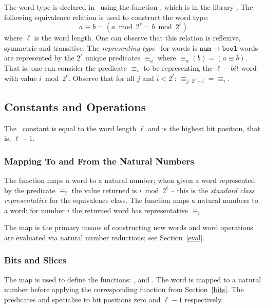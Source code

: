 The word type is declared in \HOL\ using the function , which is in the library .  The following equivalence relation is used to construct the word type:
\[ a \equiv b = (a \bmod 2^\ell = b \bmod 2^\ell) \]
where $\ell$ is the word length.
One can observe that this relation is reflexive, symmetric and transitive.
The \emph{representing type}~\cite{gordon-melham-hol} for words is $\mathtt{num}\rightarrow\mathtt{bool}$ \ie{} words are represented by the $2^\ell$ unique predicates ${\equiv_a}$ where ${\equiv_a}(b) = (a \equiv b)$.  That is, one can consider the predicate ${\equiv_i}$ to be representing the $\ell-bit$ word with value $i \bmod 2^\ell$.  Observe that for all $j$ and $i < 2^\ell$: ${\equiv_{j\cdot 2^\ell + i}} = {\equiv_i}$.

\subsection{Constants and Operations} \label{ops}

The \HOL\ constant  is equal to the word length $\ell$ and  is the highest bit position, that is, $\ell - 1$.

\subsubsection{Mapping To and From the Natural Numbers}

The function  maps a word to a natural number; when given a word represented by the predicate ${\equiv_i}$ the value returned is $i \bmod 2^\ell$ -- this is the \emph{standard class representative} for the equivalence class.  The function  maps a natural numbers to a word: for number $i$ the returned word has representative ${\equiv_i}$.

The map  is the primary means of constructing new words and word operations are evaluated via natural number reductions; see Section~\ref{eval}.

\subsubsection{Bits and Slices}

The map  is used to define the functions: ,  and .
The word is mapped to a natural number before applying the corresponding function from Section~\ref{bits}.
The predicates  and  specialise  to bit positions zero and $\ell - 1$ respectively.

